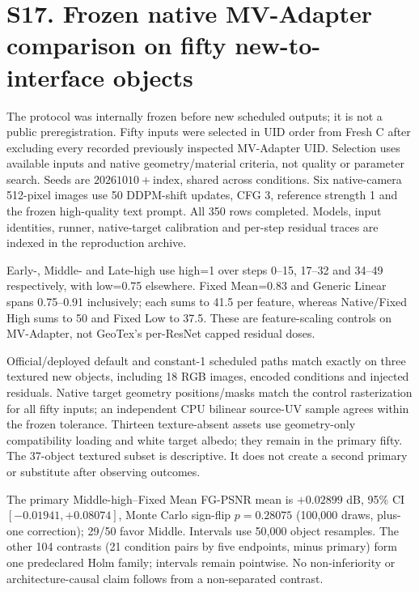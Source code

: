 \documentclass[11pt]{article}
\begin{document}
\clearpage
\section*{S17. Frozen native MV-Adapter comparison on fifty new-to-interface objects}
The protocol was internally frozen before new scheduled outputs; it is not a public preregistration. Fifty inputs were selected in UID order from Fresh C after excluding every recorded previously inspected MV-Adapter UID. Selection uses available inputs and native geometry/material criteria, not quality or parameter search. Seeds are $20261010+\mathrm{index}$, shared across conditions. Six native-camera 512-pixel images use 50 DDPM-shift updates, CFG 3, reference strength 1 and the frozen high-quality text prompt. All 350 rows completed. Models, input identities, runner, native-target calibration and per-step residual traces are indexed in the reproduction archive.

Early-, Middle- and Late-high use high=1 over steps 0--15, 17--32 and 34--49 respectively, with low=0.75 elsewhere. Fixed Mean=0.83 and Generic Linear spans 0.75--0.91 inclusively; each sums to 41.5 per feature, whereas Native/Fixed High sums to 50 and Fixed Low to 37.5. These are feature-scaling controls on MV-Adapter, not GeoTex's per-ResNet capped residual doses.

Official/deployed default and constant-1 scheduled paths match exactly on three textured new objects, including 18 RGB images, encoded conditions and injected residuals. Native target geometry positions/masks match the control rasterization for all fifty inputs; an independent CPU bilinear source-UV sample agrees within the frozen tolerance. Thirteen texture-absent assets use geometry-only compatibility loading and white target albedo; they remain in the primary fifty. The 37-object textured subset is descriptive. It does not create a second primary or substitute after observing outcomes.

The primary Middle-high--Fixed Mean FG-PSNR mean is $+0.02899$ dB, 95\% CI $[-0.01941,+0.08074]$, Monte Carlo sign-flip $p=0.28075$ (100,000 draws, plus-one correction); 29/50 favor Middle. Intervals use 50,000 object resamples. The other 104 contrasts (21 condition pairs by five endpoints, minus primary) form one predeclared Holm family; intervals remain pointwise. No non-inferiority or architecture-causal claim follows from a non-separated contrast.
\end{document}
